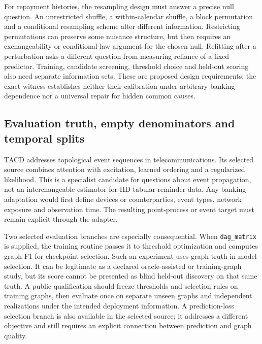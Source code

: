 For repayment histories, the resampling design must answer a precise null question. An unrestricted
shuffle, a within-calendar shuffle, a block permutation and a conditional resampling scheme alter
different information. Restricting permutations can preserve some nuisance structure, but then
requires an exchangeability or conditional-law argument for the chosen null. Refitting after a
perturbation asks a different question from measuring reliance of a fixed predictor. Training,
candidate screening, threshold choice and held-out scoring also need separate information sets.
These are proposed design requirements; the exact witness establishes neither their calibration
under arbitrary banking dependence nor a universal repair for hidden common causes.

\subsection{Evaluation truth, empty denominators and temporal splits}
TACD addresses topological event sequences in telecommunications. Its selected source combines
attention with excitation, learned ordering and a regularized likelihood. This is a specialist
candidate for questions about event propagation, not an interchangeable estimator for IID tabular
reminder data. Any banking adaptation would first define devices or counterparties, event types,
network exposure and observation time. The resulting point-process or event target must remain
explicit through the adapter.~\citep{exec28_at_tacd}

Two selected evaluation branches are especially consequential. When \texttt{dag\_matrix} is supplied,
the training routine passes it to threshold optimization and computes graph F1 for checkpoint
selection. Such an experiment uses graph truth in model selection. It can be legitimate as a
declared oracle-assisted or training-graph study, but its score cannot be presented as blind
held-out discovery on that same truth. A public qualification should freeze thresholds and
selection rules on training graphs, then evaluate once on separate unseen graphs and independent
realizations under the intended deployment information. A prediction-loss selection branch is
also available in the selected source; it addresses a different objective and still requires
an explicit connection between prediction and graph quality.~\citep{exec28_at_tacd}

